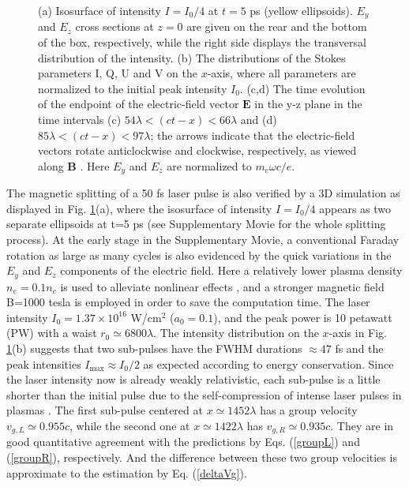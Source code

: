 \documentclass[%
aps,
preprint,
showpacs,
preprintnumbers,
 amsmath,
 amssymb,
 prl,
]{revtex4-1}
\begin{document}
\begin{figure}[htbp]
\centering
{}
\caption{(a) Isosurface of intensity $I=I_0/4$ at $t=5$ ps (yellow ellipsoids). $E_y$ and $E_z$ cross sections at $z=0$ are given on the rear and the bottom of the box, respectively, while the right side displays the transversal distribution of the intensity.
(b) The distributions of the Stokes parameters I, Q, U and V on the $x$-axis, where all parameters are normalized to the initial peak intensity $I_0$.
(c,d) The time evolution of the endpoint of the electric-field vector $\textbf{E}$ in the y-z plane in the time intervals (c) $54\lambda<(ct-x)<66\lambda$ and (d) $85\lambda<(ct-x)<97\lambda$; the arrows indicate that the electric-field vectors rotate anticlockwise and clockwise, respectively, as viewed along  $\textbf{B}$ . Here $E_y$ and $E_z$ are normalized to $m_e \omega c /e$.
} \label{fig3D}
\end{figure}

The magnetic splitting of a 50 fs laser pulse is also verified by a 3D simulation as displayed in Fig. \ref{fig3D}(a), where the isosurface of intensity $I=I_0/4$ appears as two separate ellipsoids at t=5 ps (see Supplementary Movie for the whole splitting process).
At the early stage in the Supplementary Movie, a conventional Faraday rotation as large as many cycles is also evidenced by the quick variations in the $E_y$ and $E_z$ components of the electric field.
Here a relatively lower plasma density $n_e=0.1n_c$ is used to alleviate nonlinear effects \cite{GibbonBook}, and a stronger magnetic field B=1000 tesla is employed in order to save the computation time.
The laser intensity $I_0=1.37\times10^{16}$ W/cm$^2$ ($a_0=0.1$), and the peak power is 10 petawatt (PW) with a waist $r_0 \simeq 6800\lambda$.
The intensity distribution on the $x$-axis in Fig. \ref{fig3D}(b) suggests that two sub-pulses have the FWHM durations $\approx 47$ fs and the peak intensities $I_{\max}\approx I_0/2$ as expected according to energy conservation.
Since the laser intensity now is already weakly relativistic, each sub-pulse is a little shorter than the initial pulse due to the self-compression of intense laser pulses in plasmas \cite{Shorokhov}.
The first sub-pulse centered at $x\simeq 1452\lambda$ has a group velocity $v_{g,L}\simeq 0.955c$, while the second one at $x\simeq 1422 \lambda$ has $v_{g,R}\simeq0.935c$.
They are in good quantitative agreement with the predictions by Eqs. (\ref{groupL}) and (\ref{groupR}), respectively.
And the difference between these two group velocities is approximate to the estimation by Eq. (\ref{deltaVg}).
\end{document}
